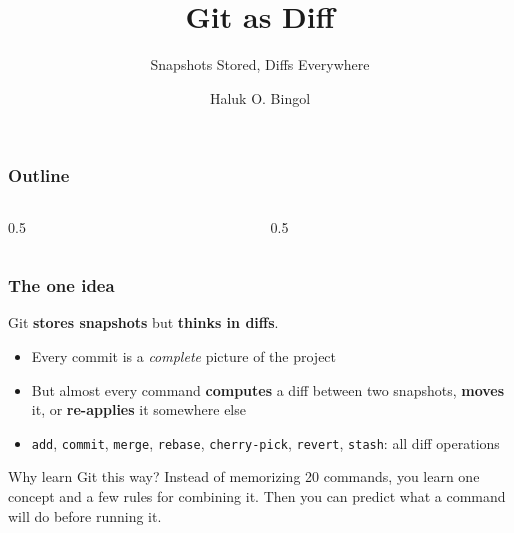 \documentclass[aspectratio=169,10pt,compress]{beamer}
\title{Git as Diff}
\subtitle{Snapshots Stored, Diffs Everywhere}
\author[Bingol]{Haluk O. Bingol}
\institute[FCIS]{
    Faculty of Computer and Information Sciences\\
    Yeditepe University
}
\date{
	{\tiny \hbTimeStamp}
}
\newcommand{\cmd}[1]{\texttt{\color{gitred}#1}}
\begin{document}
\begin{frame}[t,fragile]
  \titlepage
\end{frame}

\begin{frame}[t,fragile] \frametitle{Outline}
  \begin{columns}[T]
    \begin{column}{0.5\textwidth}
      \tableofcontents[sections={1-4}]
    \end{column}
    \begin{column}{0.5\textwidth}
      \tableofcontents[sections={5-8}]
    \end{column}
  \end{columns}
\end{frame}

\begin{frame}[t,fragile] \frametitle{The one idea}
  \vspace{1em}
  \begin{center}
    \Large Git \textbf{stores snapshots} but \textbf{thinks in diffs}.
  \end{center}
  \vspace{1em}

  \begin{itemize}
    \item Every commit is a \emph{complete} picture of the project
    \item But almost every command \textbf{computes} a diff between two snapshots,
          \textbf{moves} it, or \textbf{re-applies} it somewhere else
    \item \cmd{add}, \cmd{commit}, \cmd{merge}, \cmd{rebase}, \cmd{cherry-pick},
          \cmd{revert}, \cmd{stash}: all diff operations
  \end{itemize}

  \vspace{1em}
  \begin{block}{Why learn Git this way?}
    Instead of memorizing 20 commands, you learn one concept and a few rules for combining it.
    Then you can predict what a command will do before running it.
  \end{block}
\end{frame}

\end{document}
